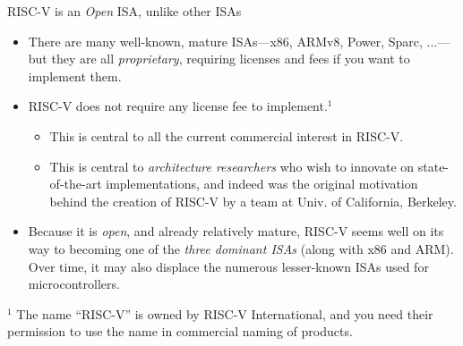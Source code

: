 \documentclass{article}
\begin{document}
\begin{center}
  {\Huge RISC-V is an \emph{Open} ISA, unlike other ISAs}

  \vspace{0.5in}

  \begin{minipage}{9in}\LARGE
    \begin{itemize}

    \item There are many well-known, mature ISAs---x86, ARMv8,
      Power, Sparc, ...---but they are all \emph{proprietary},
      requiring licenses and fees if you want to implement them.

    \item RISC-V does not require any license fee to
      implement.$^1$

      \begin{itemize}
      \item This is central to all the current commercial interest in RISC-V.
      \item This is central to \emph{architecture researchers} who
        wish to innovate on state-of-the-art implementations, and
        indeed was the original motivation behind the creation of
        RISC-V by a team at Univ. of California, Berkeley.
      \end{itemize}

    \item Because it is \emph{open}, and already relatively
      mature, RISC-V seems well on its way to becoming one of the
      \emph{three dominant ISAs} (along with x86 and ARM).  Over
      time, it may also displace the numerous lesser-known ISAs
      used for microcontrollers.

    \end{itemize}
  \end{minipage}

\vfill

{$^1$ The name ``RISC-V'' is owned by RISC-V International, and you
  need their permission to use the name in commercial naming of
  products.}
\end{center}

\clearpage

\end{document}
